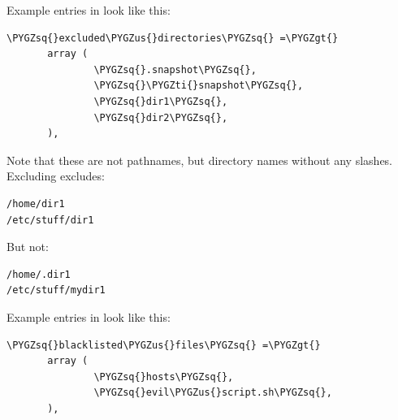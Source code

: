 \documentclass[letterpaper,10pt,english]{sphinxmanual}
\def\PYGZus{\char`\_}
\def\PYGZgt{\char`\>}
\def\PYGZsq{\char`\'}
\def\PYGZti{\char`\~}
\begin{document}
Example  entries in  look like this:

\begin{Verbatim}[commandchars=\\\{\}]
\PYGZsq{}excluded\PYGZus{}directories\PYGZsq{} =\PYGZgt{}
       array (
               \PYGZsq{}.snapshot\PYGZsq{},
               \PYGZsq{}\PYGZti{}snapshot\PYGZsq{},
               \PYGZsq{}dir1\PYGZsq{},
               \PYGZsq{}dir2\PYGZsq{},
       ),
\end{Verbatim}

Note that these are not pathnames, but directory names without any slashes. Excluding  excludes:

\begin{Verbatim}[commandchars=\\\{\}]
/home/dir1
/etc/stuff/dir1
\end{Verbatim}

But not:

\begin{Verbatim}[commandchars=\\\{\}]
/home/.dir1
/etc/stuff/mydir1
\end{Verbatim}

Example  entries in  look like this:

\begin{Verbatim}[commandchars=\\\{\}]
\PYGZsq{}blacklisted\PYGZus{}files\PYGZsq{} =\PYGZgt{}
       array (
               \PYGZsq{}hosts\PYGZsq{},
               \PYGZsq{}evil\PYGZus{}script.sh\PYGZsq{},
       ),
\end{Verbatim}
\end{document}
